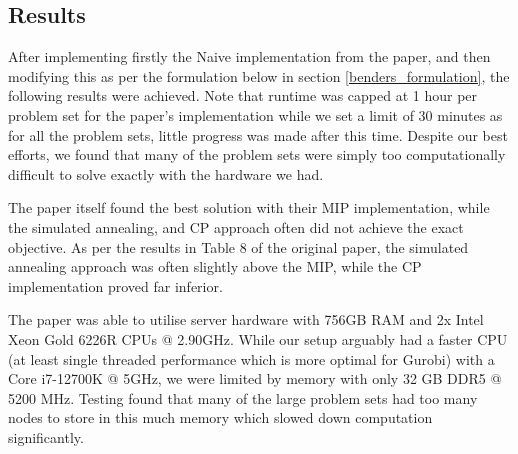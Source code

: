 \documentclass{article}
\begin{document}
\bigbreak

\subsection{Results}
After implementing firstly the Naive implementation from the paper, and then modifying this as per the formulation below in section \ref{benders_formulation}, the following results were achieved. Note that runtime was capped at 1 hour per problem set for the paper's implementation while we set a limit of 30 minutes as for all the problem sets, little progress was made after this time. Despite our best efforts, we found that many of the problem sets were simply too computationally difficult to solve exactly with the hardware we had. \medbreak

The paper itself found the best solution with their MIP implementation, while the simulated annealing, and CP approach often did not achieve the exact objective. As per the results in Table 8 of the original paper, the simulated annealing approach was often slightly above the MIP, while the CP implementation proved far inferior. \medbreak

The paper was able to utilise server hardware with 756GB RAM and 2x Intel Xeon Gold 6226R CPUs @ 2.90GHz. While our setup arguably had a faster CPU (at least single threaded performance which is more optimal for Gurobi) with a Core i7-12700K @ 5GHz, we were limited by memory with only 32 GB DDR5 @ 5200 MHz. Testing found that many of the large problem sets had too many nodes to store in this much memory which slowed down computation significantly.
\end{document}
